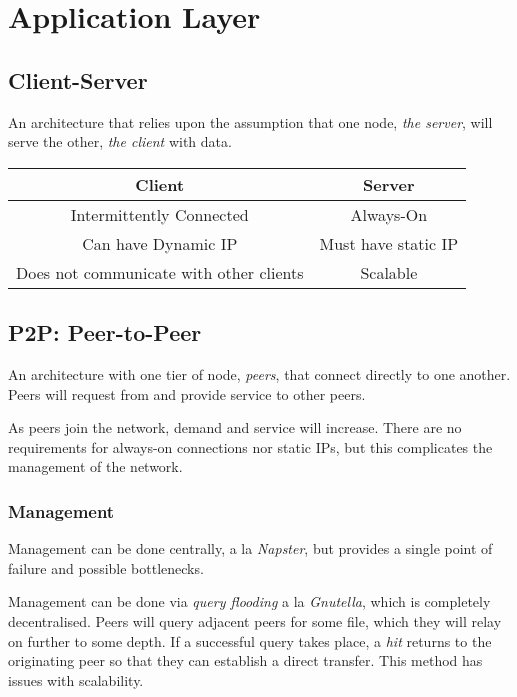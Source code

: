 \documentclass{article}
\begin{document}
\newpage
\section{Application Layer}
\subsection{Client-Server}

An architecture that relies upon the assumption that one node, \textit{the server}, will serve the other, \textit{the client} with data.

\begin{center}
  \begin{tabular}{|c|c|}
    \hline
    \textbf{Client} & \textbf{Server}\\
    \hline\hline
    Intermittently Connected & Always-On\\
    \hline
    Can have Dynamic IP & Must have static IP\\
    \hline
    Does not communicate with other clients & Scalable\\
    \hline
  \end{tabular}
\end{center}

\subsection{P2P: Peer-to-Peer}

An architecture with one tier of node, \textit{peers}, that connect directly to one another. Peers will request from and provide service to other peers.

As peers join the network, demand and service will increase. There are no requirements for always-on connections nor static IPs, but this complicates the management of the network.

\subsubsection{Management}

Management can be done centrally, a la \textit{Napster}, but provides a single point of failure and possible bottlenecks.

Management can be done via \textit{query flooding} a la \textit{Gnutella}, which is completely decentralised. Peers will query adjacent peers for some file, which they will relay on further to some depth. If a successful query takes place, a \textit{hit} returns to the originating peer so that they can establish a direct transfer. This method has issues with scalability.
\end{document}
